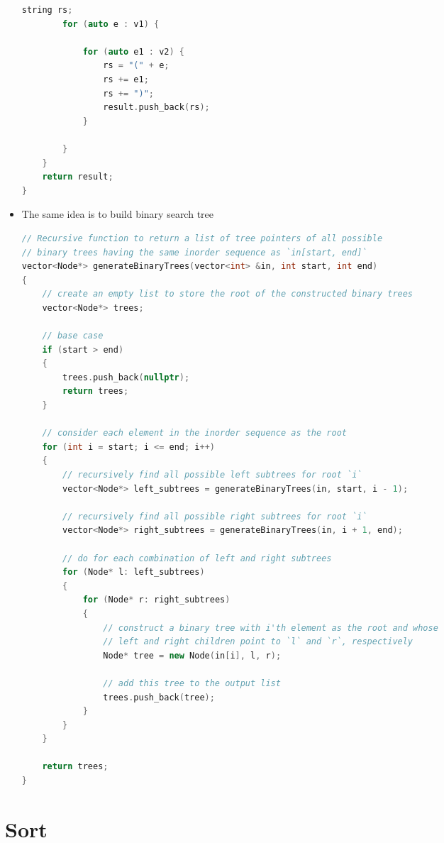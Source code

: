 \documentclass[a4paper,11pt,twoside]{book}
\begin{document}
\begin{itemize}
\begin{lstlisting}[frame=single, language=c++]
		string rs;
		for (auto e : v1) {
			
			for (auto e1 : v2) {
				rs = "(" + e;
				rs += e1;
				rs += ")";
				result.push_back(rs);
			}
			
		}
	}
	return result;
}
\end{lstlisting}

	\item The same idea is to build binary search tree

\begin{lstlisting}[frame=single, language=c++]
// Recursive function to return a list of tree pointers of all possible
// binary trees having the same inorder sequence as `in[start, end]`
vector<Node*> generateBinaryTrees(vector<int> &in, int start, int end)
{
	// create an empty list to store the root of the constructed binary trees
	vector<Node*> trees;
	
	// base case
	if (start > end)
	{
		trees.push_back(nullptr);
		return trees;
	}
	
	// consider each element in the inorder sequence as the root
	for (int i = start; i <= end; i++)
	{
		// recursively find all possible left subtrees for root `i`
		vector<Node*> left_subtrees = generateBinaryTrees(in, start, i - 1);
		
		// recursively find all possible right subtrees for root `i`
		vector<Node*> right_subtrees = generateBinaryTrees(in, i + 1, end);
		
		// do for each combination of left and right subtrees
		for (Node* l: left_subtrees)
		{
			for (Node* r: right_subtrees)
			{
				// construct a binary tree with i'th element as the root and whose
				// left and right children point to `l` and `r`, respectively
				Node* tree = new Node(in[i], l, r);
				
				// add this tree to the output list
				trees.push_back(tree);
			}
		}
	}
	
	return trees;
}
\end{lstlisting}


\end{itemize}

\section{Sort}
\end{document}
